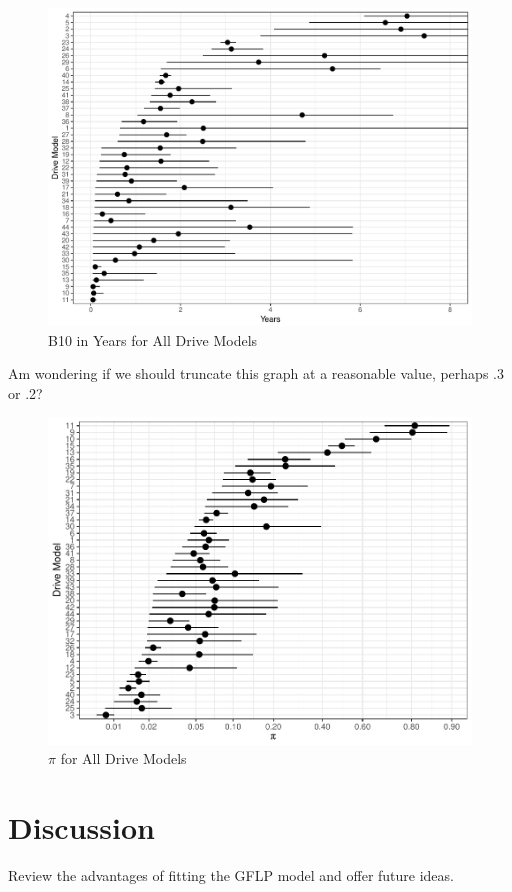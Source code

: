 \documentclass[12pt]{article}
\begin{document}
\begin{figure}[H]
    \centering
   \includegraphics[width=5.0in]{fig/B10_full.pdf}
		\caption{B10 in Years for All Drive Models \label{fig:first}} 
\end{figure}

Am wondering if we should truncate this graph at a reasonable value, perhaps .3 or .2?  

\begin{figure}[H]
    \centering
   \includegraphics[width=5.0in]{fig/pi_compare.pdf}
		\caption{$\pi$ for All Drive Models \label{fig:first}} 
\end{figure}

\section{Discussion}
Review the advantages of fitting the GFLP model and offer future ideas.  
\end{document}
